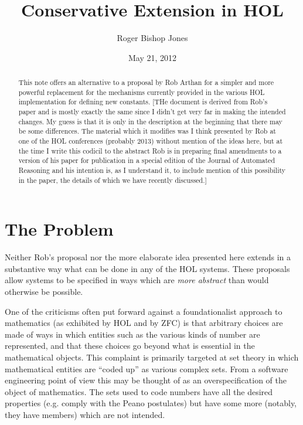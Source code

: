 \documentclass[12pt]{article}
\title{Conservative Extension in HOL}
\author{Roger Bishop Jones}
\date{May 21,  2012}
\begin{document}
\maketitle

\begin{abstract}
This note offers an alternative to a proposal by Rob Arthan for a simpler and more powerful replacement for the mechanisms currently provided in the various HOL implementation for defining new constants.
[THe document is derived from Rob's paper and is mostly exactly the same since I didn't get very far in making the intended changes.
My guess is that it is only in the description at the beginning that there may be some differences.
The material which it modifies was I think presented by Rob at one of the HOL conferences (probably 2013) without mention of the ideas here, but at the time I write this codicil to the abstract Rob is in preparing final amendments to a version of his paper for publication in a special edition of the Journal of Automated Reasoning and his intention is, as I understand it, to include mention of this possibility in the paper, the details of which we have recently discussed.]

\end{abstract}

\section{The Problem}

Neither Rob's proposal nor the more elaborate idea presented here extends in a substantive way what can be done in any of the HOL systems.
These proposals allow systems to be specified in ways which are \emph{more abstract} than would otherwise be possible.

One of the criticisms often put forward against a foundationalist approach to mathematics (as exhibited by HOL and by ZFC) is that arbitrary choices are made of ways in which entities such as the various kinds of number are represented, and that these choices go beyond what is essential in the mathematical objects.
This complaint is primarily targeted at set theory in which mathematical entities are ``coded up'' as various complex sets.
From a software engineering point of view this may be thought of as an overspecification of the object of mathematics.
The sets used to code numbers have all the desired properties (e.g. comply with the Peano postulates) but have some more (notably, they have members) which are not intended.
\end{document}
